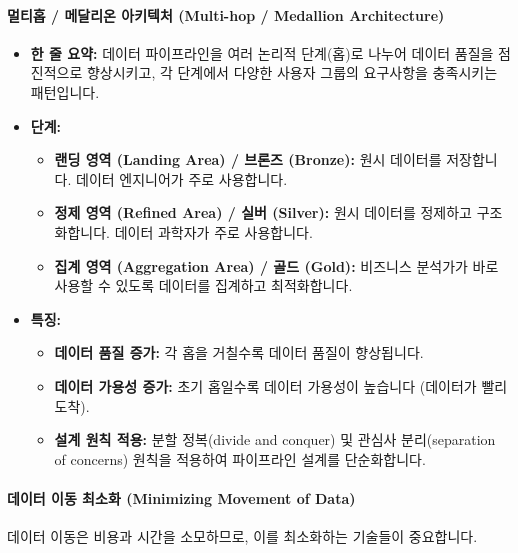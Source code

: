 \documentclass[11pt,a4paper]{article}
\begin{document}
\paragraph{멀티홉 / 메달리온 아키텍처 (Multi-hop / Medallion Architecture)}
\begin{itemize}
    \item \textbf{한 줄 요약:} 데이터 파이프라인을 여러 논리적 단계(홉)로 나누어 데이터 품질을 점진적으로 향상시키고, 각 단계에서 다양한 사용자 그룹의 요구사항을 충족시키는 패턴입니다.
    \item \textbf{단계:}
    \begin{itemize}
        \item \textbf{랜딩 영역 (Landing Area) / 브론즈 (Bronze):} 원시 데이터를 저장합니다. 데이터 엔지니어가 주로 사용합니다.
        \item \textbf{정제 영역 (Refined Area) / 실버 (Silver):} 원시 데이터를 정제하고 구조화합니다. 데이터 과학자가 주로 사용합니다.
        \item \textbf{집계 영역 (Aggregation Area) / 골드 (Gold):} 비즈니스 분석가가 바로 사용할 수 있도록 데이터를 집계하고 최적화합니다.
    \end{itemize}
    \item \textbf{특징:}
    \begin{itemize}
        \item \textbf{데이터 품질 증가:} 각 홉을 거칠수록 데이터 품질이 향상됩니다.
        \item \textbf{데이터 가용성 증가:} 초기 홉일수록 데이터 가용성이 높습니다 (데이터가 빨리 도착).
        \item \textbf{설계 원칙 적용:} 분할 정복(divide and conquer) 및 관심사 분리(separation of concerns) 원칙을 적용하여 파이프라인 설계를 단순화합니다.
    \end{itemize}
\end{itemize}

\paragraph{데이터 이동 최소화 (Minimizing Movement of Data)}
데이터 이동은 비용과 시간을 소모하므로, 이를 최소화하는 기술들이 중요합니다.
\end{document}
